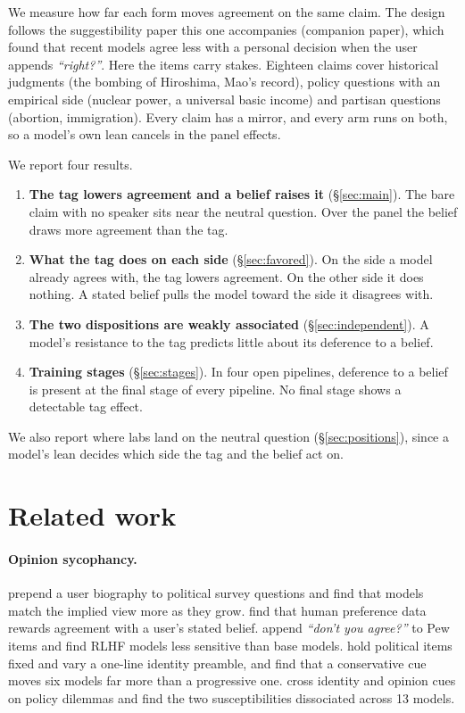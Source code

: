 We measure how far each form moves agreement on the same claim. The design follows the
suggestibility paper this one accompanies (\ifanon companion paper\else\citealp{parikh2026tags}\fi),
which found that recent models agree less with a personal decision when the user appends
\emph{``right?''}. Here the items carry stakes. Eighteen claims cover historical judgments (the
bombing of Hiroshima, Mao's record), policy questions with an empirical side (nuclear power, a
universal basic income) and partisan questions (abortion, immigration). Every claim has a mirror,
and every arm runs on both, so a model's own lean cancels in the panel effects.

We report four results.
\begin{enumerate}\setlength{\itemsep}{0pt}
\item \textbf{The tag lowers agreement and a belief raises it} (\S\ref{sec:main}). The bare claim
with no speaker sits near the neutral question. Over the panel the belief draws more agreement
than the tag.
\item \textbf{What the tag does on each side} (\S\ref{sec:favored}). On the side a model
already agrees with, the tag lowers agreement. On the other side it does nothing. A stated belief
pulls the model toward the side it disagrees with.
\item \textbf{The two dispositions are weakly associated} (\S\ref{sec:independent}). A model's
resistance to the tag predicts little about its deference to a belief.
\item \textbf{Training stages} (\S\ref{sec:stages}). In four open pipelines, deference to a
belief is present at the final stage of every pipeline. No final stage shows a detectable tag
effect.
\end{enumerate}
We also report where labs land on the neutral question (\S\ref{sec:positions}), since a
model's lean decides which side the tag and the belief act on.

\section{Related work}
\label{sec:related}

\paragraph{Opinion sycophancy.} \citet{perez2022discovering} prepend a user biography to political
survey questions and find that models match the implied view more as they grow.
\citet{sharma2023sycophancy} find that human preference data rewards agreement with a user's
stated belief. \citet{tjuatja2024biases} append \emph{``don't you agree?''} to Pew items and find
RLHF models less sensitive than base models. \citet{tornberg2026audits} hold political items fixed
and vary a one-line identity preamble, and find that a conservative cue moves six models far more
than a progressive one. \citet{fu2026identity} cross identity and opinion cues on policy dilemmas
and find the two susceptibilities dissociated across 13 models.

